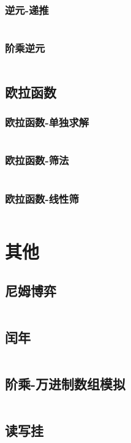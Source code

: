 \documentclass[a4paper,11pt]{article}
\begin{document}
\subsubsection{逆元-递推}
\inputminted[breaklines]{c++}{数论/逆元-递推.cpp}
\subsubsection{阶乘逆元}
\inputminted[breaklines]{c++}{数论/阶乘逆元.cpp}
\subsection{欧拉函数}
\subsubsection{欧拉函数-单独求解}
\inputminted[breaklines]{c++}{数论/欧拉函数-单独求解.cpp}
\subsubsection{欧拉函数-筛法}
\inputminted[breaklines]{c++}{数论/欧拉函数-筛法.cpp}
\subsubsection{欧拉函数-线性筛}
\inputminted[breaklines]{c++}{数论/欧拉函数-线性筛.cpp}
\section{其他}
\subsection{尼姆博弈}
\inputminted[breaklines]{c++}{其他/尼姆博弈.cpp}
\subsection{闰年}
\inputminted[breaklines]{c++}{其他/闰年.cpp}
\subsection{阶乘-万进制数组模拟}
\inputminted[breaklines]{c++}{其他/阶乘-万进制模拟.cpp}
\subsection{读写挂}
\inputminted[breaklines]{c++}{其他/读写挂.cpp}

\end{document}
